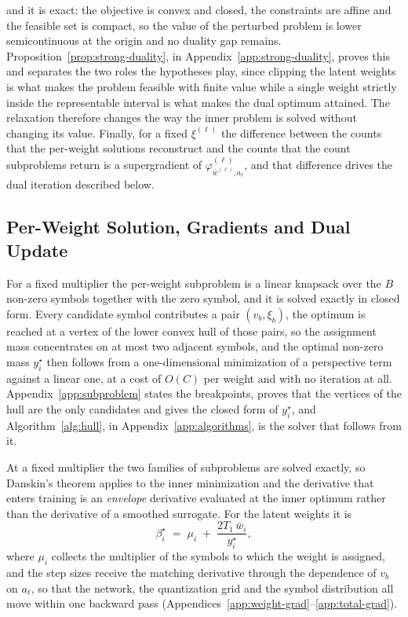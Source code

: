 \documentclass{article}
\begin{document}
and it is exact: the objective is convex and closed, the constraints are affine
and the feasible set is compact, so the value of the perturbed problem is lower
semicontinuous at the origin and no duality gap remains.
Proposition~\ref{prop:strong-duality}, in Appendix~\ref{app:strong-duality},
proves this and separates the two roles the hypotheses play, since clipping the latent weights is what makes the problem
feasible with finite value while a single weight strictly inside the representable
interval is what makes the dual optimum attained. The relaxation therefore changes
the way the inner problem is solved without changing its value. Finally,
for a fixed $\xi^{(\ell)}$ the difference between the counts that the per-weight
solutions reconstruct and the counts that the count subproblems return is a
supergradient of $\varphi_{\bar w^{(\ell)},a_\ell}^{(\ell)}$, and that difference
drives the dual iteration described below.

\subsection{Per-Weight Solution, Gradients and Dual Update}
\label{sec:per-weight-subproblem}
\label{sec:joint-gradients}
\label{sec:optimization-order}

For a fixed multiplier the per-weight subproblem is a linear knapsack over the
$B$ non-zero symbols together with the zero symbol, and it is solved exactly in
closed form. Every candidate symbol contributes a pair $(v_b,\xi_b)$, the optimum
is reached at a vertex of the lower convex hull of those pairs, so the assignment
mass concentrates on at most two adjacent symbols, and the optimal non-zero mass
$y_i^\star$ then follows from a one-dimensional minimization of a perspective
term against a linear one, at a cost of $O(C)$ per weight and with no iteration
at all. Appendix~\ref{app:subproblem} states the breakpoints, proves that the
vertices of the hull are the only candidates and gives the closed form of
$y_i^\star$, and Algorithm~\ref{alg:hull}, in Appendix~\ref{app:algorithms}, is
the solver that follows from it.

At a fixed multiplier the two families of subproblems are solved exactly, so
Danskin's theorem applies to the inner minimization and the derivative that
enters training is an \emph{envelope} derivative evaluated at the inner optimum
rather than the derivative of a smoothed surrogate. For the latent weights it is
\begin{equation}
  \beta^\star_i \;=\; \mu_i \;+\; \frac{2T_1\,\bar w_i}{y_i^\star},
  \label{eq:beta-star}
\end{equation}
where $\mu_i$ collects the multiplier of the symbols to which the weight is
assigned, and the step sizes receive the matching derivative through the
dependence of $v_b$ on $a_\ell$, so that the network, the quantization grid and
the symbol distribution all move within one backward pass
(Appendices~\ref{app:weight-grad}--\ref{app:total-grad}).
\end{document}
